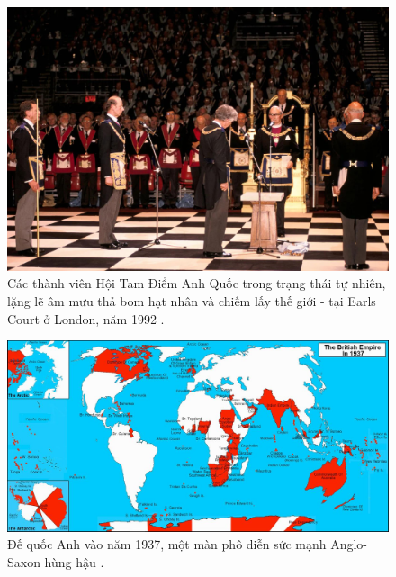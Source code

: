 \begin{figure}[b]
\begin{center}
\includegraphics[width=1\linewidth]{freemason.jpg}
\end{center}
   \caption{Các thành viên Hội Tam Điểm Anh Quốc trong trạng thái tự nhiên, lặng lẽ âm mưu thả bom hạt nhân và chiếm lấy thế giới - tại Earls Court ở London, năm 1992 \cite{5}.}
\label{fig:1}
\label{fig:onecol}
\end{figure}

\begin{figure}[t]
\begin{center}
\includegraphics[width=1\textwidth]{british.jpg}
\end{center}
   \caption{Đế quốc Anh vào năm 1937, một màn phô diễn sức mạnh Anglo-Saxon hùng hậu \cite{14}.}
   \label{fig:2}
\end{figure}

